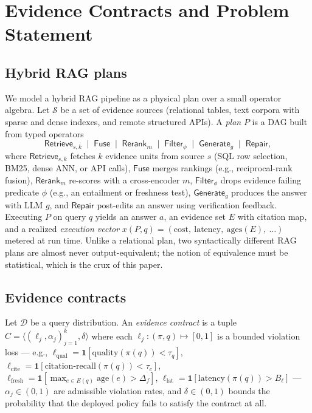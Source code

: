 \section{Evidence Contracts and Problem Statement}
\label{sec:contracts}

\subsection{Hybrid RAG plans}
\label{sec:algebra}

We model a hybrid RAG pipeline as a physical plan over a small operator
algebra. Let $\mathcal{S}$ be a set of evidence sources (relational tables,
text corpora with sparse and dense indexes, and remote structured APIs). A
\emph{plan} $P$ is a DAG built from typed operators
\[
\textsf{Retrieve}_{s,k} \;\mid\; \textsf{Fuse} \;\mid\; \textsf{Rerank}_m
\;\mid\; \textsf{Filter}_\phi \;\mid\; \textsf{Generate}_g \;\mid\;
\textsf{Repair},
\]
where $\textsf{Retrieve}_{s,k}$ fetches $k$ evidence units from source $s$
(SQL row selection, BM25, dense ANN, or API calls),
$\textsf{Fuse}$ merges rankings (e.g., reciprocal-rank fusion),
$\textsf{Rerank}_m$ re-scores with a cross-encoder $m$, $\textsf{Filter}_\phi$
drops evidence failing predicate $\phi$ (e.g., an entailment or freshness
test), $\textsf{Generate}_g$ produces the answer with LLM $g$, and
$\textsf{Repair}$ post-edits an answer using verification feedback.
Executing $P$ on query $q$ yields an answer $a$, an evidence set $E$ with
citation map, and a realized \emph{execution vector}
$x(P,q) = (\text{cost},\ \text{latency},\ \text{ages}(E),\ \dots)$ metered at
run time. Unlike a relational plan, two syntactically different RAG plans are
almost never output-equivalent; the notion of equivalence must be statistical,
which is the crux of this paper.

\subsection{Evidence contracts}

\begin{definition}
\label{def:contract}
Let $\mathcal{D}$ be a query distribution. An \emph{evidence contract} is a
tuple $C = \langle (\ell_j, \alpha_j)_{j=1}^{k}, \delta \rangle$ where each
$\ell_j : (\pi, q) \mapsto [0,1]$ is a bounded violation loss --- e.g.,
$\ell_{\text{qual}} = \mathbf{1}[\mathrm{quality}(\pi(q)) < \tau_q]$,
$\ell_{\text{cite}} = \mathbf{1}[\mathrm{citation\text{-}recall}(\pi(q)) < \tau_c]$,
$\ell_{\text{fresh}} = \mathbf{1}[\max_{e \in E(q)} \mathrm{age}(e) > \Delta_f]$,
$\ell_{\text{lat}} = \mathbf{1}[\mathrm{latency}(\pi(q)) > B_\ell]$ ---
$\alpha_j \in (0,1)$ are admissible violation rates, and $\delta \in (0,1)$
bounds the probability that the deployed policy fails to satisfy the
contract at all.
\end{definition}

